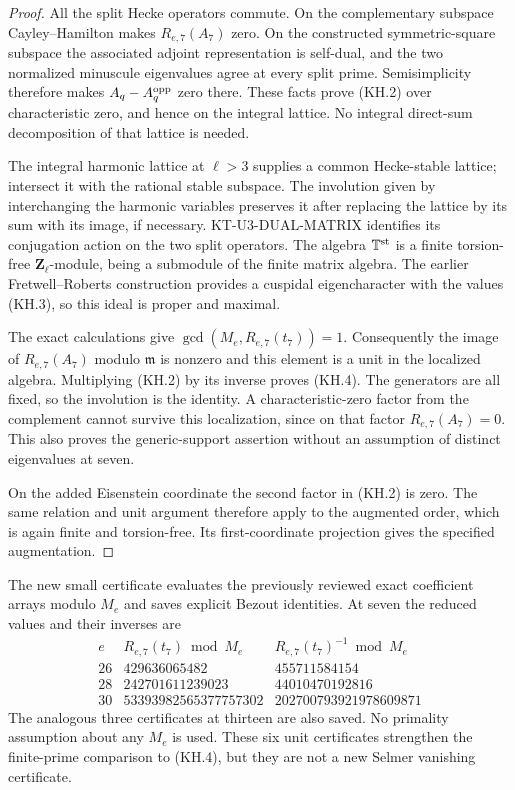 \documentclass[11pt,a4paper]{article}
\theoremstyle{definition}
\begin{document}
\begin{proof}
All the split Hecke operators commute.  On the complementary
subspace Cayley--Hamilton makes $R_{e,7}(A_7)$ zero.  On the
constructed symmetric-square subspace the associated adjoint
representation is self-dual, and the two normalized minuscule
eigenvalues agree at every split prime.  Semisimplicity therefore
makes $A_q-A_q^{\rm opp}$ zero there.  These facts prove (KH.2)
over characteristic zero, and hence on the integral lattice.
No integral direct-sum decomposition of that lattice is needed.

The integral harmonic lattice at $\ell>3$ supplies a common
Hecke-stable lattice; intersect it with the rational stable
subspace.  The involution given by interchanging the harmonic
variables preserves it after replacing the lattice by its sum
with its image, if necessary.  KT-U3-DUAL-MATRIX identifies its
conjugation action on the two split operators.  The algebra
$\mathbb T^{\rm st}$ is a finite torsion-free
$\mathbf Z_\ell$-module, being a submodule of the finite matrix
algebra.  The earlier Fretwell--Roberts construction provides a
cuspidal eigencharacter with the values (KH.3), so this ideal is
proper and maximal.

The exact calculations give
$\gcd(M_e,R_{e,7}(t_7))=1$.  Consequently the image of
$R_{e,7}(A_7)$ modulo $\mathfrak m$ is nonzero and this element
is a unit in the localized algebra.  Multiplying (KH.2) by its
inverse proves (KH.4).  The generators are all fixed, so the
involution is the identity.  A characteristic-zero factor from
the complement cannot survive this localization, since on that
factor $R_{e,7}(A_7)=0$.  This also proves the generic-support
assertion without an assumption of distinct eigenvalues at seven.

On the added Eisenstein coordinate the second factor in (KH.2)
is zero.  The same relation and unit argument therefore apply
to the augmented order, which is again finite and torsion-free.
Its first-coordinate projection gives the specified augmentation.
\end{proof}

The new small certificate 
evaluates the previously reviewed exact coefficient arrays
modulo $M_e$ and saves explicit Bezout identities.  At seven
the reduced values and their inverses are
\[
\begin{array}{c|r|r}
e&R_{e,7}(t_7)\bmod M_e&R_{e,7}(t_7)^{-1}\bmod M_e\\\hline
26&429636065482&455711584154\\
28&242701611239023&44010470192816\\
30&53393982565377757302&202700793921978609871
\end{array}                                                   \tag{KH.5}
\]
The analogous three certificates at thirteen are also saved.
No primality assumption about any $M_e$ is used.  These six unit
certificates strengthen the finite-prime comparison to (KH.4),
but they are not a new Selmer vanishing certificate.
\end{document}
